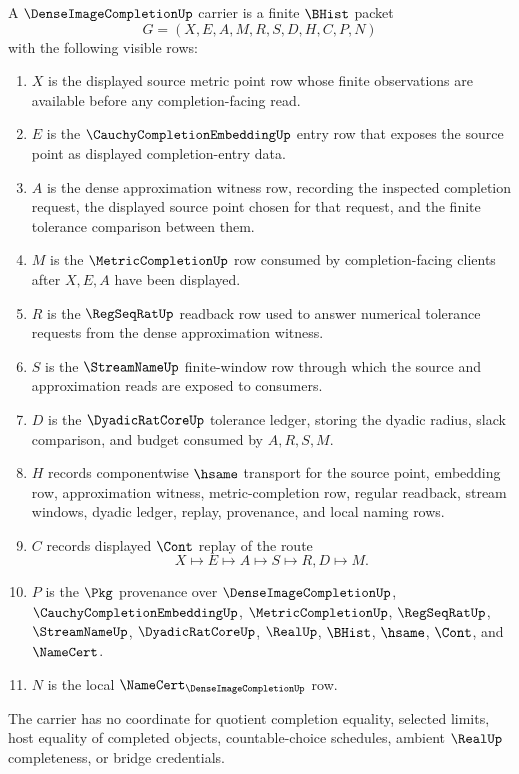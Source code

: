 \begin{definition}
\label{def:dense-image-completion-carrier}
A $\DenseImageCompletionUp$ carrier is a finite $\BHist$ packet
$$
G=(X,E,A,M,R,S,D,H,C,P,N)
$$
with the following visible rows:
\begin{enumerate}
\item $X$ is the displayed source metric point row whose finite observations are available before any completion-facing read.
\item $E$ is the $\CauchyCompletionEmbeddingUp$ entry row that exposes the source point as displayed completion-entry data.
\item $A$ is the dense approximation witness row, recording the inspected completion request, the displayed source point chosen for that request, and the finite tolerance comparison between them.
\item $M$ is the $\MetricCompletionUp$ row consumed by completion-facing clients after $X,E,A$ have been displayed.
\item $R$ is the $\RegSeqRatUp$ readback row used to answer numerical tolerance requests from the dense approximation witness.
\item $S$ is the $\StreamNameUp$ finite-window row through which the source and approximation reads are exposed to consumers.
\item $D$ is the $\DyadicRatCoreUp$ tolerance ledger, storing the dyadic radius, slack comparison, and budget consumed by $A,R,S,M$.
\item $H$ records componentwise $\hsame$ transport for the source point, embedding row, approximation witness, metric-completion row, regular readback, stream windows, dyadic ledger, replay, provenance, and local naming rows.
\item $C$ records displayed $\Cont$ replay of the route
$$
X \longmapsto E \longmapsto A \longmapsto S \longmapsto R,D \longmapsto M .
$$
\item $P$ is the $\Pkg$ provenance over $\DenseImageCompletionUp$, $\CauchyCompletionEmbeddingUp$, $\MetricCompletionUp$, $\RegSeqRatUp$, $\StreamNameUp$, $\DyadicRatCoreUp$, $\RealUp$, $\BHist$, $\hsame$, $\Cont$, and $\NameCert$.
\item $N$ is the local $\NameCert_{\DenseImageCompletionUp}$ row.
\end{enumerate}
The carrier has no coordinate for quotient completion equality, selected limits, host equality of completed objects, countable-choice schedules, ambient $\RealUp$ completeness, or bridge credentials.
\end{definition}

